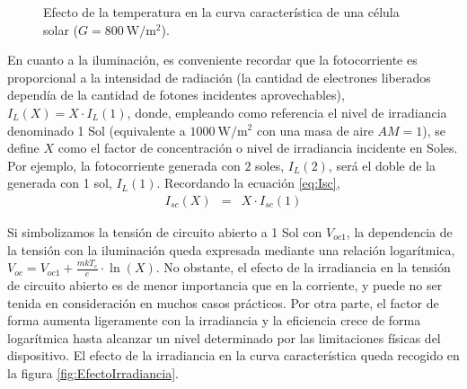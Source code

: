 \begin{figure}
\begin{centering}
{}
\end{centering}

\caption{Efecto de la temperatura en la curva característica de una célula
solar ($G=\SI{800}{\watt\per\meter\squared}$).\label{fig:EfectoTemperatura}}

\end{figure}



En cuanto a la iluminación, es conveniente recordar que la fotocorriente
es proporcional a la intensidad de radiación (la cantidad de electrones
liberados dependía de la cantidad de fotones incidentes aprovechables),
$I_{L}(X)=X\cdot I_{L}(1)$, donde, empleando como referencia el nivel
de irradiancia denominado 1 Sol (equivalente a $\SI{1000}{\watt\per\meter\squared}$
con una masa de aire $AM=1$), se define $X$ como el factor de concentración
o nivel de irradiancia incidente en Soles. Por ejemplo, la fotocorriente
generada con $2$ soles, $I_{L}(2)$, será el doble de la generada
con 1 sol, $I_{L}(1)$. Recordando la ecuación \ref{eq:Isc}, \begin{eqnarray}
I_{sc}(X) & = & X\cdot I_{sc}(1)\label{eq:IscRadiacion}\end{eqnarray}


Si simbolizamos la tensión de circuito abierto a 1 Sol con $V_{oc1}$,
la dependencia de la tensión con la iluminación queda expresada mediante
una relación logarítmica, $V_{oc}=V_{oc1}+\frac{mkT_{c}}{e}\cdot\ln(X)$.
No obstante, el efecto de la irradiancia en la tensión de circuito
abierto es de menor importancia que en la corriente, y puede no ser
tenida en consideración en muchos casos prácticos. Por otra parte,
el factor de forma aumenta ligeramente con la irradiancia y la eficiencia
crece de forma logarítmica hasta alcanzar un nivel determinado por
las limitaciones físicas del dispositivo. El efecto de la irradiancia
en la curva característica queda recogido en la figura \ref{fig:EfectoIrradiancia}.


